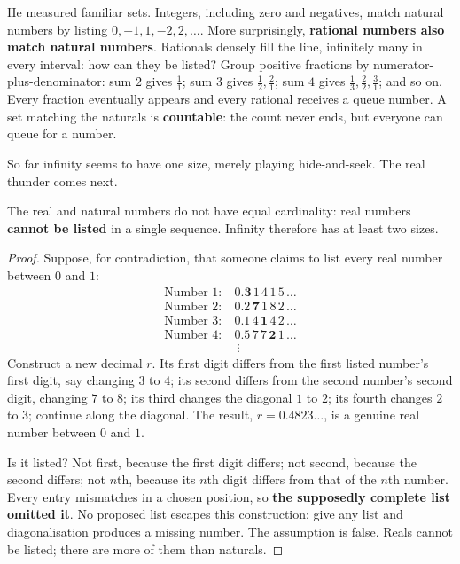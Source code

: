 He measured familiar sets. Integers, including zero and negatives, match natural numbers by listing $0, -1, 1, -2, 2, \ldots$. More surprisingly, \textbf{rational numbers also match natural numbers}. Rationals densely fill the line, infinitely many in every interval: how can they be listed? Group positive fractions by numerator-plus-denominator: sum $2$ gives $\frac{1}{1}$; sum $3$ gives $\frac{1}{2}, \frac{2}{1}$; sum $4$ gives $\frac{1}{3}, \frac{2}{2}, \frac{3}{1}$; and so on. Every fraction eventually appears and every rational receives a queue number. A set matching the naturals is \textbf{countable}: the count never ends, but everyone can queue for a number.

So far infinity seems to have one size, merely playing hide-and-seek. The real thunder comes next.

\begin{dingli}
The real and natural numbers do not have equal cardinality: real numbers \textbf{cannot be listed} in a single sequence. Infinity therefore has at least two sizes.
\end{dingli}

\begin{proof}
Suppose, for contradiction, that someone claims to list every real number between $0$ and $1$:
\begin{align*}
\text{Number 1:}\ & 0.\mathbf{3}\,1\,4\,1\,5\,\ldots\\
\text{Number 2:}\ & 0.2\,\mathbf{7}\,1\,8\,2\,\ldots\\
\text{Number 3:}\ & 0.1\,4\,\mathbf{1}\,4\,2\,\ldots\\
\text{Number 4:}\ & 0.5\,7\,7\,\mathbf{2}\,1\,\ldots\\
& \ \vdots
\end{align*}
Construct a new decimal $r$. Its first digit differs from the first listed number's first digit, say changing $3$ to $4$; its second differs from the second number's second digit, changing $7$ to $8$; its third changes the diagonal $1$ to $2$; its fourth changes $2$ to $3$; continue along the diagonal. The result, $r = 0.4823\ldots$, is a genuine real number between $0$ and $1$.

Is it listed? Not first, because the first digit differs; not second, because the second differs; not $n$th, because its $n$th digit differs from that of the $n$th number. Every entry mismatches in a chosen position, so \textbf{the supposedly complete list omitted it}. No proposed list escapes this construction: give any list and diagonalisation produces a missing number. The assumption is false. Reals cannot be listed; there are more of them than naturals.
\end{proof}


